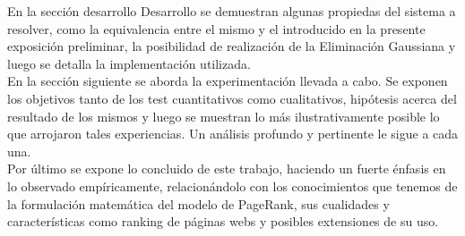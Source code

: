En la sección desarrollo Desarrollo se demuestran algunas propiedas del sistema a resolver, como la equivalencia entre el mismo y el introducido en la presente exposición preliminar, la posibilidad de realización de la Eliminación Gaussiana y luego se detalla la implementación utilizada.\\

En la sección siguiente se aborda la experimentación llevada a cabo. Se exponen los objetivos tanto de los test cuantitativos como cualitativos, hipótesis acerca del resultado de los mismos y luego se muestran lo más ilustrativamente posible lo que arrojaron tales experiencias. Un análisis profundo y pertinente le sigue a cada una. \\

Por último se expone lo concluido de este trabajo, haciendo un fuerte énfasis en lo observado empíricamente, relacionándolo con los conocimientos que tenemos de la formulación matemática del modelo de PageRank, sus cualidades y características como ranking de páginas webs y posibles extensiones de su uso.




 